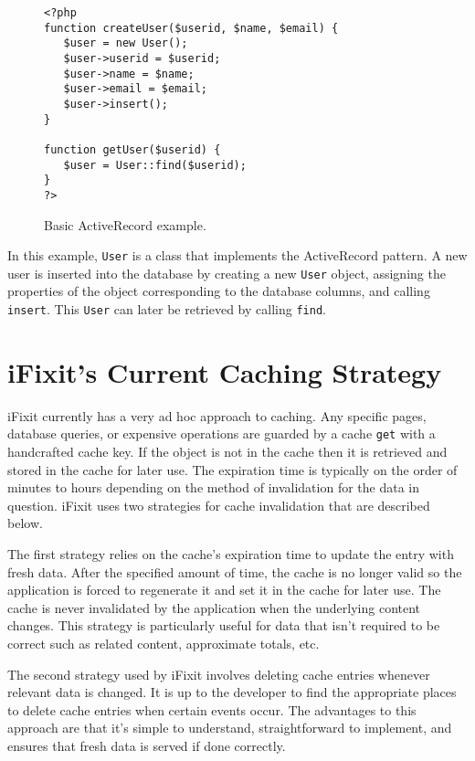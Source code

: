 \documentclass[12pt]{ucthesis}
\begin{document}
\begin{figure}[h]
\begin{verbatim}
<?php
function createUser($userid, $name, $email) {
   $user = new User();
   $user->userid = $userid;
   $user->name = $name;
   $user->email = $email;
   $user->insert();
}

function getUser($userid) {
   $user = User::find($userid);
}
?>
\end{verbatim}
\caption{Basic ActiveRecord example.}
\label{fig:activeRecordExample}
\end{figure}

In this example, {\tt User} is a class that implements the ActiveRecord pattern.
A new user is inserted into the database by creating a new {\tt User} object, assigning the properties of the object corresponding to the database columns, and calling {\tt insert}.
This {\tt User} can later be retrieved by calling {\tt find}.


\section{iFixit's Current Caching Strategy}
iFixit currently has a very ad hoc approach to caching.
Any specific pages, database queries, or expensive operations are guarded by a cache {\tt get} with a handcrafted cache key.
If the object is not in the cache then it is retrieved and stored in the cache for later use.
The expiration time is typically on the order of minutes to hours depending on the method of invalidation for the data in question.
iFixit uses two strategies for cache invalidation that are described below.

The first strategy relies on the cache's expiration time to update the entry with fresh data.
After the specified amount of time, the cache is no longer valid so the application is forced to regenerate it and set it in the cache for later use.
The cache is never invalidated by the application when the underlying content changes.
This strategy is particularly useful for data that isn't required to be correct such as related content, approximate totals, etc.

The second strategy used by iFixit involves deleting cache entries whenever relevant data is changed.
It is up to the developer to find the appropriate places to delete cache entries when certain events occur.
The advantages to this approach are that it's simple to understand, straightforward to implement, and ensures that fresh data is served if done correctly.
\end{document}
